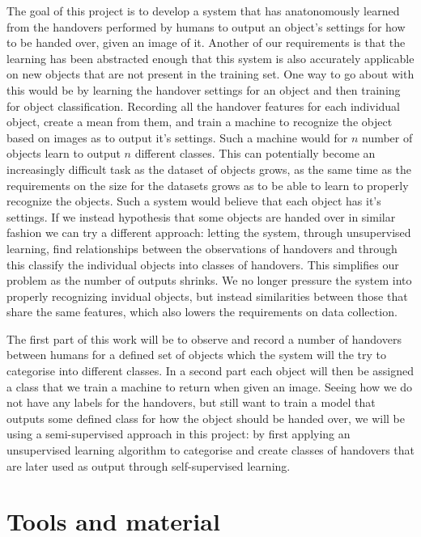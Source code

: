 The goal of this project is to develop a system that has anatonomously learned from the handovers performed by humans to output an object's settings for how to be handed over, given an image of it. Another of our requirements is that the learning has been abstracted enough that this system is also accurately applicable on new objects that are not present in the training set. One way to go about with this would be by learning the handover settings for an object and then training for object classification. Recording all the handover features for each individual object, create a mean from them, and train a machine to recognize the object based on images as to output it's settings. Such a machine would for \(n\) number of objects learn to output \(n\) different classes. This can potentially become an increasingly difficult task as the dataset of objects grows, as the same time as the requirements on the size for the datasets grows as to be able to learn to properly recognize the objects. Such a system would believe that each object has it's settings. If we instead hypothesis that some objects are handed over in similar fashion we can try a different approach:  letting the system, through unsupervised learning, find relationships between the observations of handovers and through this classify the individual objects into classes of handovers. This simplifies our problem as the number of outputs shrinks. We no longer pressure the system into properly recognizing invidual objects, but instead similarities between those that share the same features, which also lowers the requirements on data collection.

The first part of this work will be to observe and record a number of handovers between humans for a defined set of objects which the system will the try to categorise into different classes. In a second part each object will then be assigned a class that we train a machine to return when given an image. Seeing how we do not have any labels for the handovers, but still want to train a model that outputs some defined class for how the object should be handed over, we will be using a semi-supervised approach in this project: by first applying an unsupervised learning algorithm to categorise and create classes of handovers that are later used as output through self-supervised learning.

\section{Tools and material}

